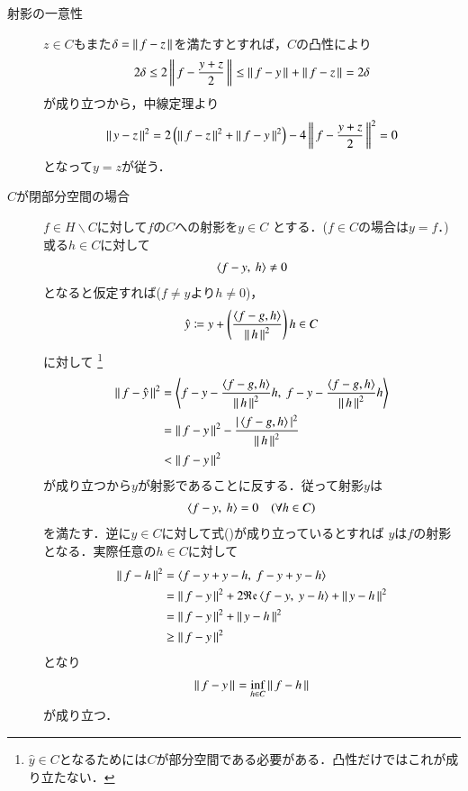 \begin{prf}
\begin{description}
	\item[射影の一意性]
		$z \in C$もまた$\delta = \left\|\, f - z\, \right\|_{}$を満たすとすれば，$C$の凸性により
		\begin{align}
			2 \delta \leq 2\left\|\, f - \frac{y + z}{2}\, \right\|_{} \leq \left\|\, f - y\, \right\|_{} + \left\|\, f - z\, \right\|_{} = 2\delta
		\end{align}
		が成り立つから，中線定理より
		\begin{align}
			\left\|\, y - z\, \right\|_{}^2 = 2\left( \left\|\, f - z\, \right\|_{}^2 + \left\|\, f - y\, \right\|_{}^2 \right) - 4\left\|\, f - \frac{y + z}{2}\, \right\|_{}^2 = 0
		\end{align}
		となって$y = z$が従う．
	
	\item[$C$が閉部分空間の場合]
		$f \in H \backslash C$に対して$f$の$C$への射影を$y \in C$
		とする．($f \in C$の場合は$y = f$．)或る$h \in C$に対して
		\begin{align}
			\inprod<f -y,\ h> \neq 0
		\end{align}
		となると仮定すれば($f \neq y$より$h \neq 0$)，
		\begin{align}
			\hat{y} \coloneqq y + \left( \frac{\inprod<f - g,h>}{\Norm{h}{}^2} \right)h \in C
		\end{align}
		に対して
		\footnote{
			$\hat{y} \in C$となるためには$C$が部分空間である必要がある．凸性だけではこれが成り立たない．
		}
		\begin{align}
			\Norm{f - \hat{y}}{}^2 
			&= \inprod<f - y - \frac{\inprod<f - g,h>}{\Norm{h}{}^2}h,\ f - y - \frac{\inprod<f - g,h>}{\Norm{h}{}^2}h> \\
			&= \Norm{f-y}{}^2 - \frac{|\inprod<f - g,h>|^2}{\Norm{h}{}^2} \\
			&< \Norm{f-y}{}^2
		\end{align}
		が成り立つから$y$が射影であることに反する．従って射影$y$は
		\begin{align}
			\inprod<f -y,\ h> = 0 \quad (\forall h \in C) \label{eq:projection}
		\end{align}
		を満たす．逆に$y \in C$に対して式()が成り立っているとすれば
		$y$は$f$の射影となる．実際任意の$h \in C$に対して
		\begin{align}
			\Norm{f - h}{}^2 &= \inprod<f - y + y - h,\ f - y + y - h> \\
			&= \Norm{f - y}{}^2 + 2 \Re{\inprod<f - y,\ y - h>} + \Norm{y - h}{}^2 \\
			&= \Norm{f - y}{}^2 + \Norm{y - h}{}^2 \\
			&\geq \Norm{f - y}{}^2
		\end{align}
		となり
		\begin{align}
			\left\|\, f - y\, \right\|_{} = \operatorname*{inf}_{h \in C} \left\|\, f - h\, \right\|_{}
		\end{align}
		が成り立つ．
	\end{description}
	\QED
\end{prf}

